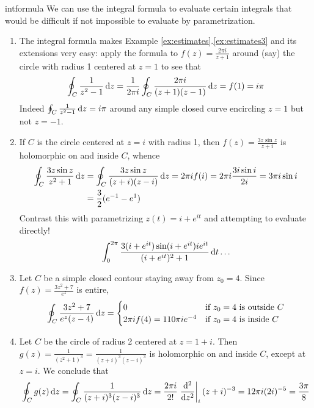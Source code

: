\goodbreak






\begin{examples}{}{intformula}
	We can use the integral formula to evaluate certain integrals that would be difficult if not impossible to evaluate by parametrization.
	\begin{enumerate}
	  \item The integral formula makes Example \ref*{ex:estimates}.\ref{ex:estimates3} and its extensions very easy: apply the formula to $f(z)=\frac{2\pi i}{z+1}$ around (say) the circle with radius 1 centered at $z=1$ to see that
  	\[
  		\oint_C \frac 1{z^2-1}\,\dz =\frac 1{2\pi i}\oint_C \frac{2\pi i}{(z+1)(z-1)}\,\dz =f(1) =i\pi 
  	\]
  	Indeed $\oint_C \frac 1{z^2-1}\,\dz =i\pi$ around any simple closed curve encircling $z=1$ but not $z=-1$.
	  
	  \item If $C$ is the circle centered at $z=i$ with radius 1, then $f(z)=\frac{3z\sin z}{z+i}$ is holomorphic on and inside $C$, whence
	  \begin{align*}
	  	\oint_C\frac{3z\sin z}{z^2+1}\,\dz 
	  	&=\oint_C\frac{3z\sin z}{(z+i)(z-i)}\,\dz
	  	=2\pi if(i)
	  	=2\pi i\frac{3i\sin i}{2i}
	  	=3\pi i\sin i\\
	  	&=\frac 32(e^{-1}-e^1)
	  \end{align*}
	  Contrast this with parametrizing $z(t)=i+e^{it}$ and attempting to evaluate directly!
 	  \[
 	  	\int_0^{2\pi}\frac{3(i+e^{it})\sin(i+e^{it})ie^{it}}{(i+e^{it})^2+1}\,\dt\ldots
	  \]
	  
	  \item Let $C$ be a simple closed contour staying away from $z_0=4$. Since $f(z)=\frac{3z^2+7}{e^z}$ is entire,
	  \[
	  	\oint_C\frac{3z^2+7}{e^z(z-4)}\,\dz=
	  	\begin{cases}
	  		0&\text{if $z_0=4$ is outside $C$}\\
	  		2\pi if(4)=110\pi ie^{-4}&\text{if $z_0=4$ is inside $C$}
	  	\end{cases}
	  \]
	  
	  \item Let $C$ be the circle of radius 2 centered at $z=1+i$. Then $g(z)=\frac 1{(z^2+1)^3}=\frac 1{(z+i)^3(z-i)^3}$ is holomorphic on and inside $C$, except at $z=i$. We conclude that
	  \[
	  	\oint_Cg(z)\,\dz=\oint_C\frac 1{(z+i)^3(z-i)^3}\,\dz=\frac{2\pi i}{2!}\diffat[^2]{z^2}{i}(z+i)^{-3} =12\pi i(2i)^{-5} =\frac{3\pi}{8}
	  \]
	\end{enumerate}
\end{examples}

